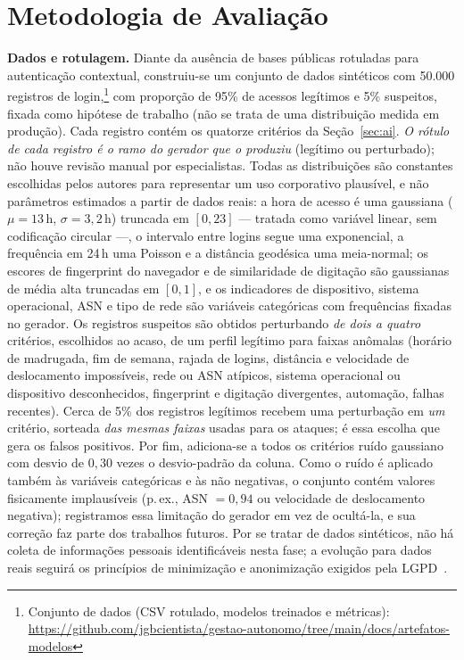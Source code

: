 \documentclass[conference]{IEEEtran}
\begin{document}
\section{Metodologia de Avaliação}
\label{sec:method}
\textbf{Dados e rotulagem.} Diante da ausência de bases públicas
rotuladas para autenticação contextual, construiu-se um conjunto de dados
sintéticos com 50.000 registros de login,\footnote{Conjunto de dados (CSV rotulado, modelos treinados e métricas): \url{https://github.com/jgbcientista/gestao-autonomo/tree/main/docs/artefatos-modelos}} com
proporção de 95\% de acessos legítimos e 5\% suspeitos, fixada
como hipótese de trabalho (não se trata de uma distribuição medida em
produção). Cada registro contém os quatorze critérios da
Seção~\ref{sec:ai}. \emph{O rótulo de cada registro é o ramo do gerador
que o produziu} (legítimo ou perturbado); não houve revisão manual por
especialistas. Todas as distribuições são constantes escolhidas pelos
autores para representar um uso corporativo plausível, e não parâmetros
estimados a partir de dados reais: a hora de acesso é uma gaussiana
($\mu=13$\,h, $\sigma=3{,}2$\,h) truncada em $[0,23]$ --- tratada como
variável linear, sem codificação circular ---, o intervalo entre logins
segue uma exponencial, a frequência em 24\,h uma Poisson e a distância
geodésica uma meia-normal; os escores de fingerprint do navegador e de
similaridade de digitação são gaussianas de média alta truncadas em
$[0,1]$, e os indicadores de dispositivo, sistema operacional, ASN e
tipo de rede são variáveis categóricas com frequências fixadas no
gerador. Os registros suspeitos são obtidos perturbando \emph{de dois a
quatro} critérios, escolhidos ao acaso, de um perfil legítimo para faixas
anômalas (horário de madrugada, fim de semana, rajada de logins,
distância e velocidade de deslocamento impossíveis, rede ou ASN
atípicos, sistema operacional ou dispositivo desconhecidos,
fingerprint e digitação divergentes, automação, falhas recentes). Cerca de 5\% dos registros legítimos recebem uma perturbação
em \emph{um} critério, sorteada \emph{das mesmas faixas} usadas para os
ataques; é essa escolha que gera os falsos positivos. Por fim,
adiciona-se a todos os critérios ruído gaussiano com desvio de $0{,}30$
vezes o desvio-padrão da coluna. Como o ruído é aplicado também às
variáveis categóricas e às não negativas, o conjunto contém valores
fisicamente implausíveis (p.\,ex., ASN $=0{,}94$ ou velocidade de
deslocamento negativa); registramos essa limitação do gerador em vez de
ocultá-la, e sua correção faz parte dos trabalhos futuros. Por se tratar de dados
sintéticos, não há coleta de
informações pessoais identificáveis nesta fase; a evolução para dados
reais seguirá os princípios de minimização e anonimização exigidos pela
LGPD~\cite{lgpd2018}.
\end{document}
